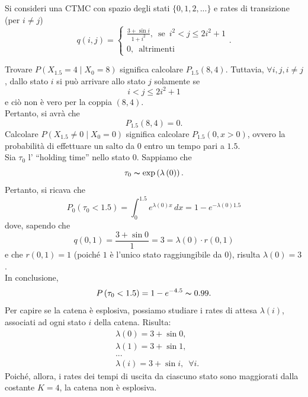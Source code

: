 \documentclass[12pt]{homework}
\begin{document}
\section{}%
Si consideri una CTMC con spazio degli stati $\{0,1,2,...\}$ e rates di transizione (per $i\neq j$)
\begin{equation*}
q\left(i,j\right)=\begin{cases}\frac{3+\sin{i}}{1+i^{2}},\,\,\,\text{se}\,\,\,i^{2}<j\leq 2i^{2}+1\\0, \,\,\,\text{altrimenti}\end{cases}.
\end{equation*}
\begin{alphaparts}
\questionpart
Trovare $P\left(X_{1.5}=4 \mid X_{0}=8\right)$ significa calcolare $P_{1.5}\left(8,4\right)$. Tuttavia, $\forall i,j, i\neq j$, dallo stato $i$ si può arrivare allo stato $j$ solamente se 
\begin{equation*}
i<j\leq 2i^{2}+1
\end{equation*}
e ciò non è vero per la coppia $\left(8,4\right)$.\\
Pertanto, si avrà che
\begin{equation*}
P_{1.5}\left(8,4\right)=0.
\end{equation*}
\questionpart
Calcolare $P\left(X_{1.5}\neq 0 \mid X_{0}=0\right)$ significa calcolare $P_{1.5}\left(0,x>0\right)$, ovvero la probabilità di effettuare un salto da $0$ entro un tempo pari a $1.5$.\\
Sia $\tau_{0}$ l' ``holding time'' nello stato $0$. Sappiamo che
\begin{equation*}
\tau_{0}\thicksim \text{exp}\left(\lambda\left(0\right)\right).
\end{equation*}
Pertanto, si ricava che
\begin{equation*}
P_{0}\left(\tau_{0}<1.5\right)=\int_{0}^{1.5} e^{\lambda\left(0\right)x} \,dx= 1 - e^{-\lambda\left(0\right)1.5}
\end{equation*}
dove, sapendo che
\begin{equation*}
q\left(0,1\right)=\frac{3+\sin{0}}{1}=3=\lambda\left(0\right)\cdot r\left(0,1\right)
\end{equation*}
e che $r\left(0,1\right)=1$ (poiché $1$ è l'unico stato raggiungibile da $0$), risulta $\lambda\left(0\right)=3$.\\
In conclusione,
\begin{equation*}
P\left(\tau_{0}<1.5\right)=1-e^{-4.5}\thicksim 0.99.
\end{equation*}
\questionpart
Per capire se la catena è esplosiva, possiamo studiare i rates di attesa $\lambda\left(i\right)$, associati ad ogni stato $i$ della catena. Risulta:
\begin{align*}
&\lambda\left(0\right)= 3+ \sin{0},\\
&\lambda\left(1\right)= 3 + \sin{1},\\
&...\\
&\lambda\left(i\right)=3+\sin{i}, \,\,\, \forall i.
\end{align*}
Poiché, allora, i rates dei tempi di uscita da ciascuno stato sono maggiorati dalla costante $K=4$, la catena non è esplosiva.


\end{alphaparts}
\end{document}
